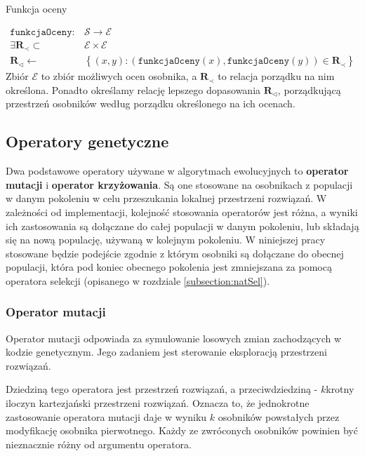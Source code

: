 \documentclass[twoside]{iisthesis}
\newcommand{\important}{\mathcal}
\newcommand{\R}{\mathbf{R}}
\newcommand{\minorityEvalRel}{{\R}_{\prec}}
\newcommand{\minoritySpecimenRel}{{\R}_{\lhd}}
\newcommand{\param}{\mathtt}
\begin{document}
\begin{signature}
	\caption{Funkcja oceny \label{signature:eval}}
	\begin{align}
		\param{funkcjaOceny}: &\important{S} \rightarrow \important{E} \\
		\exists \minorityEvalRel \subset &\important{E} \times \important{E} \\
		\minoritySpecimenRel \gets &\left\{ (x, y): (\param{funkcjaOceny}(x), \param{funkcjaOceny}(y)) \in \minorityEvalRel \right\}
	\end{align}
	Zbiór $\important{E}$ to zbiór możliwych ocen osobnika, 
	a $\minorityEvalRel$ to relacja porządku na nim określona. Ponadto określamy relację lepszego dopasowania $\minoritySpecimenRel$, porządkującą przestrzeń osobników według porządku określonego na ich ocenach. 
\end{signature}

\subsection{Operatory genetyczne}

Dwa podstawowe operatory używane w algorytmach ewolucyjnych to \textbf{operator mutacji} i \textbf{operator krzyżowania}. Są one stosowane na osobnikach z populacji w danym pokoleniu w celu przeszukania lokalnej przestrzeni rozwiązań. W zależności od implementacji, kolejność stosowania operatorów jest różna, a wyniki ich zastosowania są dołączane do całej populacji w danym pokoleniu, lub składają się na nową populację, używaną w kolejnym pokoleniu. W niniejszej pracy stosowane będzie podejście zgodnie z którym osobniki są dołączane do obecnej populacji, która pod koniec obecnego pokolenia jest zmniejszana za pomocą operatora selekcji (opisanego w rozdziale \ref{subsection:natSel}).

\subsubsection{Operator mutacji}
Operator mutacji odpowiada za symulowanie losowych zmian zachodzących w kodzie genetycznym. Jego zadaniem jest sterowanie eksploracją przestrzeni rozwiązań.

Dziedziną tego operatora jest przestrzeń rozwiązań, a przeciwdziedziną - $k$krotny iloczyn kartezjański przestrzeni rozwiązań. Oznacza to, że jednokrotne zastosowanie operatora mutacji daje w wyniku $k$ osobników powstałych przez modyfikację osobnika pierwotnego. Każdy ze zwróconych osobników powinien być nieznacznie różny od argumentu operatora. 
\end{document}
